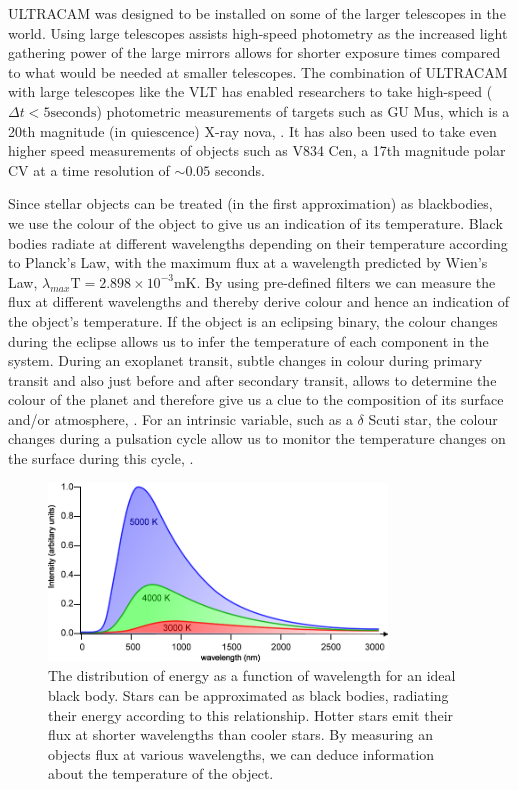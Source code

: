 ULTRACAM was designed to be installed on some of the larger telescopes in the world. Using large telescopes assists high-speed photometry as the increased light gathering power of the large mirrors allows for shorter exposure times compared to what would be needed at smaller telescopes. The combination of ULTRACAM with large telescopes like the VLT has enabled researchers to take high-speed ($\Delta t<5 \mbox{seconds}$) photometric measurements of targets such as GU Mus, which is a 20th magnitude (in quiescence) X-ray nova, \citep{tariq2010}. It has also been used to take even higher speed measurements of objects such as V834 Cen, a 17th magnitude polar CV at a time resolution of $\sim 0.05$ seconds.

Since stellar objects can be treated (in the first approximation) as blackbodies, we use the colour of the object to give us an indication of its temperature. Black bodies radiate at different wavelengths depending on their temperature according to Planck's Law, with the maximum flux at a wavelength predicted by Wien's Law, $\lambda_{max}\mbox{T} = 2.898\times10^{-3}\mbox{mK}$. By using pre-defined filters we can measure the flux at different wavelengths and thereby derive colour and hence an indication of the object's temperature. If the object is an eclipsing binary, the colour changes during the eclipse allows us to infer the temperature of each component in the system. During an exoplanet transit, subtle changes in colour during primary transit and also just before and after secondary transit, allows to determine the colour of the planet and therefore give us a clue to the composition of its surface and/or atmosphere, \citep{2012ApJS..201...36B}. For an intrinsic variable, such as a $\delta$ Scuti star, the colour changes during a pulsation cycle allow us to monitor the temperature changes on the surface during this cycle, \citep{KurtzBook}.

\begin{figure}
\centering
\includegraphics[width=90mm]{images/wienslaw.png}
\caption[Caption for LOF]{The distribution of energy as a function of wavelength for an ideal black body\protect\footnotemark. Stars can be approximated as black bodies, radiating their energy according to this relationship. Hotter stars emit their flux at shorter wavelengths than cooler stars. By measuring an objects flux at various wavelengths, we can deduce information about the temperature of the object.}
\label{fig:wienslaw}
\end{figure}

